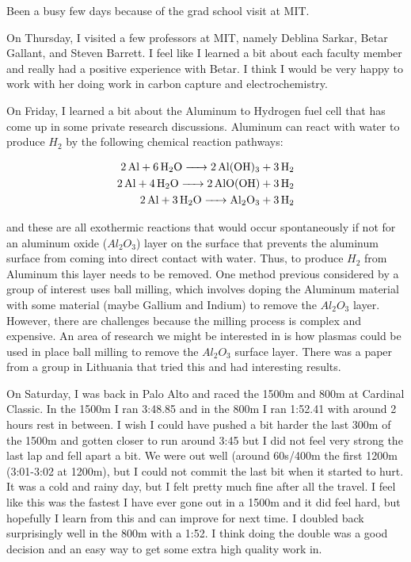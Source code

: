 \documentclass[12pt]{report}
\begin{document}
\par
Been a busy few days because of the grad school visit at MIT. 

\par
On Thursday, I visited a few professors at MIT, namely Deblina Sarkar, Betar Gallant, and Steven Barrett.  I feel like I learned a bit about each faculty member and really had a positive experience with Betar. I think I would be very happy to work with her doing work in carbon capture and electrochemistry. 

\par
On Friday, I learned a bit about the Aluminum to Hydrogen fuel cell that has come up in some private research discussions. Aluminum can react with water to produce $H_2$ by the following chemical reaction pathways: 

\begin{align}
\ce{2 Al + 6H_2O -> 2 Al(OH)_3 + 3H_2} \\
\ce{2 Al + 4H_2O -> 2 AlO(OH) + 3H_2} \\
\ce{2 Al + 3H_2O -> Al_2O_3 + 3H_2}
\end{align}

and these are all exothermic reactions that would occur spontaneously if not for an aluminum oxide ($Al_2O_3$) layer on the surface that prevents the aluminum surface from coming into direct contact with water. Thus, to produce $H_2$ from Aluminum this layer needs to be removed. One method previous considered by a group of interest uses ball milling, which involves doping the Aluminum material with some material (maybe Gallium and Indium) to remove the $Al_2O_3$ layer. However, there are challenges because the milling process is complex and expensive. An area of research we might be interested in is how plasmas could be used in place ball milling to remove the $Al_2O_3$ surface layer. There was a paper from a group in Lithuania that tried this and had interesting results.

\par
On Saturday, I was back in Palo Alto and raced the 1500m and 800m at Cardinal Classic. In the 1500m I ran 3:48.85 and in the 800m I ran 1:52.41 with around 2 hours rest in between. I wish I could have pushed a bit harder the last 300m of the 1500m and gotten closer to run around 3:45 but I did not feel very strong the last lap and fell apart a bit. We were out well (around 60s/400m the first 1200m (3:01-3:02 at 1200m), but I could not commit the last bit when it started to hurt. It was a cold and rainy day, but I felt pretty much fine after all the travel. I feel like this was the fastest I have ever gone out in a 1500m and it did feel hard, but hopefully I learn from this and can improve for next time. I doubled back surprisingly well in the 800m with a 1:52. I think doing the double was a good decision and an easy way to get some extra high quality work in. 
\end{document}
